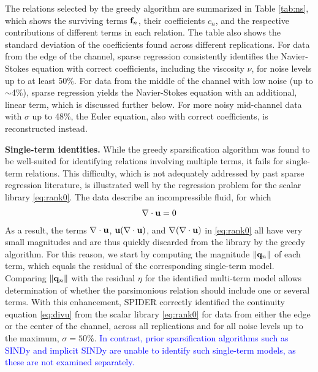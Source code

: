 \documentclass[9pt,twocolumn,twoside,lineno]{pnas-new}
\begin{document}
The relations selected by the greedy algorithm are summarized in Table \ref{tab:ns}, which shows the surviving terms ${\bf f}_n$, their coefficients $c_n$, and the respective contributions of different terms in each relation. The table also shows the standard deviation of the coefficients found across different replications. For data from the edge of the channel, sparse regression consistently identifies the Navier-Stokes equation with correct coefficients, including the viscosity $\nu$, for noise levels up to at least 50\%. For data from the middle of the channel with low noise (up to $\sim$4\%), sparse regression yields the Navier-Stokes equation with an additional, linear term, which is discussed further below. For more noisy mid-channel data with $\sigma$ up to 48\%, the Euler equation, also with correct coefficients, is reconstructed instead.

{\bf Single-term identities.} While the greedy sparsification algorithm was found to be well-suited for identifying relations involving multiple terms, it fails for single-term relations. This difficulty, which is not adequately addressed by past sparse regression literature, is illustrated well by the regression problem for the scalar library \eqref{eq:rank0}. The data describe an incompressible fluid, for which 
\begin{align}\label{eq:divu}
    \nabla\cdot{\bf u}=0
\end{align}
As a result, the terms $\nabla\cdot{\bf u}$, ${\bf u}(\nabla\cdot{\bf u})$, and $\nabla(\nabla\cdot{\bf u})$ in \eqref{eq:rank0} all have very small magnitudes and are thus quickly discarded from the library by the greedy algorithm. 
For this reason, we start by computing the magnitude $\|{\bf q}_n\|$ of each term, which equals the residual of the corresponding single-term model. Comparing $\|{\bf q}_n\|$ with the residual $\eta$ for the identified multi-term model allows determination of whether the parsimonious relation should include one or several terms. With this enhancement, SPIDER correctly identified the continuity equation \eqref{eq:divu} from the scalar library \eqref{eq:rank0} for data from either the edge or the center of the channel, across all replications and for all noise levels up to the maximum, $\sigma = 50\%$. \textcolor{blue}{In contrast, prior sparsification algorithms such as SINDy \cite{brunton2016} and implicit SINDy \cite{mangan2016} are unable to identify such single-term models, as these are not examined separately.} 
\end{document}
